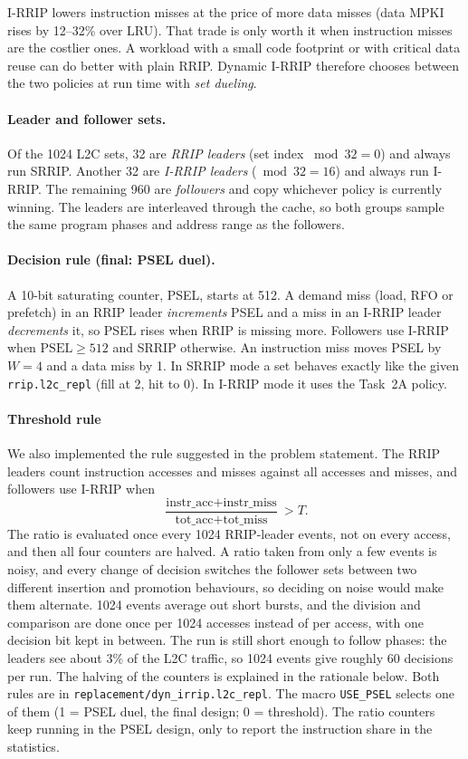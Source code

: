 \documentclass[11pt,a4paper]{article}
\begin{document}
I-RRIP lowers instruction misses at the price of more data misses (data MPKI rises by 12--32\% over LRU).
That trade is only worth it when instruction misses are the costlier ones. A workload with a small code footprint
or with critical data reuse can do better with plain RRIP. Dynamic I-RRIP therefore chooses between the two
policies at run time with \emph{set dueling}.

\paragraph{Leader and follower sets.} Of the 1024 L2C sets, 32 are \emph{RRIP leaders} (set index $\bmod 32 = 0$)
and always run SRRIP. Another 32 are \emph{I-RRIP leaders} ($\bmod 32 = 16$) and always run I-RRIP. The remaining
960 are \emph{followers} and copy whichever policy is currently winning. The leaders are interleaved
through the cache, so both groups sample the same program phases and address range as the followers.

\paragraph{Decision rule (final: PSEL duel).} A 10-bit saturating counter, PSEL, starts at 512.
A demand miss (load, RFO or prefetch) in an RRIP leader \emph{increments} PSEL and a miss in an I-RRIP
leader \emph{decrements} it, so PSEL rises when RRIP is missing more. Followers use I-RRIP when
$\text{PSEL} \ge 512$ and SRRIP otherwise. An instruction miss moves PSEL by $W=4$ and a data miss
by 1. In SRRIP mode a set behaves exactly like the given \texttt{rrip.l2c\_repl} (fill at 2, hit to 0).
In I-RRIP mode it uses the Task~2A policy.

\paragraph{Threshold rule} We also implemented the rule suggested in the problem statement.
The RRIP leaders count instruction accesses and misses against all accesses and misses, and followers use
I-RRIP when
\[
  \frac{\text{instr\_acc} + \text{instr\_miss}}{\text{tot\_acc} + \text{tot\_miss}} > T .
\]
The ratio is evaluated once every 1024 RRIP-leader events, not on every access, and then all four counters are halved.
A ratio taken from only a few events is noisy, and every change of decision switches the follower sets between two different
insertion and promotion behaviours, so deciding on noise would make them alternate. 1024 events average out short bursts, and the
division and comparison are done once per 1024 accesses instead of per access, with one decision bit kept in between. The run is still
short enough to follow phases: the leaders see about 3\% of the L2C traffic, so 1024 events give roughly 60 decisions per run.
The halving of the counters is explained in the rationale below. Both rules
are in \texttt{replacement/dyn\_irrip.l2c\_repl}. The macro \texttt{USE\_PSEL} selects one of them
(1 = PSEL duel, the final design; 0 = threshold). The ratio counters keep running in the PSEL design, only to report
the instruction share in the statistics.
\end{document}
